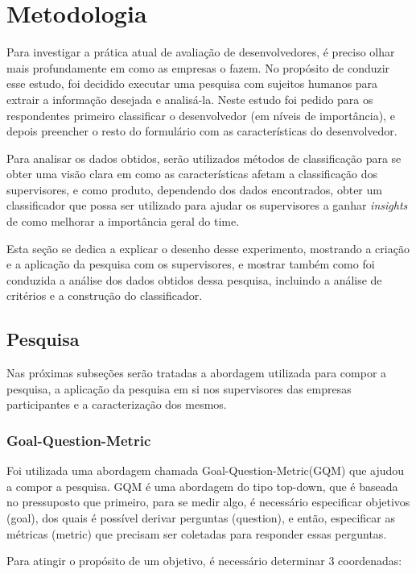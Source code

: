 \chapter[Metodolodia]{Metodologia}

Para investigar a prática atual de avaliação de desenvolvedores, é preciso olhar mais profundamente em como as empresas o fazem. No propósito de conduzir esse estudo, foi decidido executar uma pesquisa com sujeitos humanos para extrair a informação desejada e analisá-la. Neste estudo foi pedido para os respondentes primeiro classificar o desenvolvedor (em níveis de importância), e depois preencher o resto do formulário com as características do desenvolvedor.

Para analisar os dados obtidos, serão utilizados métodos de classificação para se obter uma visão clara em como as características afetam a classificação dos supervisores, e como produto, dependendo dos dados encontrados, obter um classificador que possa ser utilizado para ajudar os supervisores a ganhar \textit{insights} de como melhorar a importância geral do time.

Esta seção se dedica a explicar o desenho desse experimento, mostrando a criação e a aplicação da pesquisa com os supervisores, e mostrar também como foi conduzida a análise dos dados obtidos dessa pesquisa, incluindo a análise de critérios e a construção do classificador.

\section{Pesquisa}\label{secao3.2}

Nas próximas subseções serão tratadas a abordagem utilizada para compor a pesquisa, a aplicação da pesquisa em si nos supervisores das empresas participantes e a caracterização dos mesmos.

\subsection{Goal-Question-Metric}\label{secao3.2.1}
Foi utilizada uma abordagem chamada Goal-Question-Metric(GQM) \cite{Basili1994} que ajudou a compor a pesquisa. GQM é uma abordagem do tipo top-down, que é baseada no pressuposto que primeiro, para se medir algo, é necessário especificar objetivos (goal), dos quais é possível derivar perguntas (question), e então, especificar as métricas (metric) que precisam ser coletadas para responder essas perguntas.

Para atingir o propósito de um objetivo, é necessário determinar 3 coordenadas:

